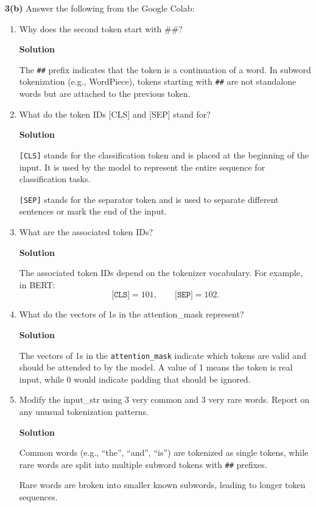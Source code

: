 \documentclass[10pt]{article}
\begin{document}
\textbf{3(b)} Answer the following from the Google Colab:
\begin{enumerate}[label=\roman*.]
    \item Why does the second token start with \#\#?
    
    \textbf{Solution}
    
    The \texttt{\#\#} prefix indicates that the token is a continuation of a word. In subword tokenization (e.g., WordPiece), tokens starting with \texttt{\#\#} are not standalone words but are attached to the previous token.
    
    \item What do the token IDs [CLS] and [SEP] stand for?
    
    \textbf{Solution}
    
    \texttt{[CLS]} stands for the classification token and is placed at the beginning of the input. It is used by the model to represent the entire sequence for classification tasks.
    
    \texttt{[SEP]} stands for the separator token and is used to separate different sentences or mark the end of the input.
    
    \item What are the associated token IDs?
    
    \textbf{Solution}
    
    The associated token IDs depend on the tokenizer vocabulary. For example, in BERT:
    \[
    \texttt{[CLS]} = 101, \qquad \texttt{[SEP]} = 102.
    \]
    
    \item What do the vectors of 1s in the attention\_mask represent?
    
    \textbf{Solution}
    
    The vectors of 1s in the \texttt{attention\_mask} indicate which tokens are valid and should be attended to by the model. A value of 1 means the token is real input, while 0 would indicate padding that should be ignored.
    
    \item Modify the input\_str using 3 very common and 3 very rare words. Report on any unusual tokenization patterns.
    
    \textbf{Solution}
    
    Common words (e.g., ``the'', ``and'', ``is'') are tokenized as single tokens, while rare words are split into multiple subword tokens with \texttt{\#\#} prefixes.
    
    Rare words are broken into smaller known subwords, leading to longer token sequences.
    

\end{enumerate}
\end{document}
